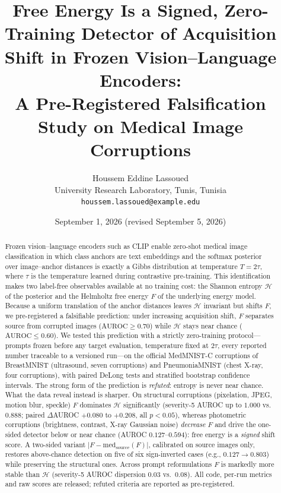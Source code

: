 \documentclass[11pt]{article}
\title{Free Energy Is a Signed, Zero-Training Detector of Acquisition Shift
in Frozen Vision--Language Encoders:\\
A Pre-Registered Falsification Study on Medical Image Corruptions}
\author{Houssem Eddine Lassoued\\
\small University Research Laboratory, Tunis, Tunisia\\
\small \texttt{houssem.lassoued@example.edu}}
\date{September 1, 2026 (revised September 5, 2026)}
\newcommand{\Hent}{\mathcal{H}}
\begin{document}
\maketitle

\begin{abstract}
Frozen vision--language encoders such as CLIP enable zero-shot medical image
classification in which class anchors are text embeddings and the softmax
posterior over image--anchor distances is exactly a Gibbs distribution at
temperature $T=2\tau$, where $\tau$ is the temperature learned during
contrastive pre-training. This identification makes two label-free observables
available at no training cost: the Shannon entropy $\Hent$ of the posterior and
the Helmholtz free energy $F$ of the underlying energy model. Because a uniform
translation of the anchor distances leaves $\Hent$ invariant but shifts $F$, we
pre-registered a falsifiable prediction: under increasing acquisition shift,
$F$ separates source from corrupted images
($\mathrm{AUROC}\!\ge\!0.70$) while $\Hent$ stays near chance
($\mathrm{AUROC}\!\le\!0.60$). We tested this prediction with a strictly
zero-training protocol---prompts frozen before any target evaluation,
temperature fixed at $2\tau$, every reported number traceable to a versioned
run---on the official MedMNIST-C corruptions of BreastMNIST (ultrasound, seven
corruptions) and PneumoniaMNIST (chest X-ray, four corruptions), with paired
DeLong tests and stratified bootstrap confidence intervals. The strong form of
the prediction is \emph{refuted}: entropy is never near chance. What the data
reveal instead is sharper. On structural corruptions (pixelation, JPEG, motion
blur, speckle) $F$ dominates $\Hent$ significantly (severity-5 AUROC up to
$1.000$ vs.\ $0.888$; paired $\Delta$AUROC $+0.080$ to $+0.208$, all
$p<0.05$), whereas photometric corruptions (brightness, contrast, X-ray
Gaussian noise) \emph{decrease} $F$ and drive the one-sided detector below or
near chance (AUROC $0.127$--$0.594$): free energy is a \emph{signed} shift score.
A two-sided variant $|F-\mathrm{med}_{\mathrm{source}}(F)|$, calibrated on
source images only, restores above-chance detection on five of six
sign-inverted cases (e.g., $0.127\!\to\!0.803$) while preserving the structural
ones. Across prompt reformulations $F$ is markedly more stable than $\Hent$
(severity-5 AUROC dispersion $0.03$ vs.\ $0.08$). All code, per-run metrics and
raw scores are released; refuted criteria are reported as pre-registered.
\end{abstract}
\end{document}

